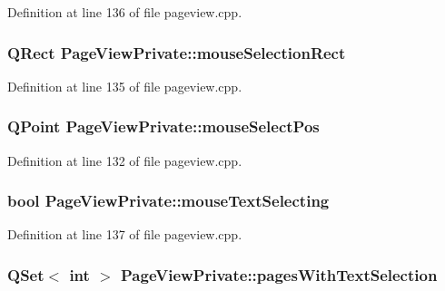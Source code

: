 Definition at line 136 of file pageview.\+cpp.

\hypertarget{classPageViewPrivate_a94473cb593838a977bea89214bd1ef66}{
\subsubsection[{mouse\+Selection\+Rect}]{\setlength{\rightskip}{0pt plus 5cm}Q\+Rect Page\+View\+Private\+::mouse\+Selection\+Rect}}\label{classPageViewPrivate_a94473cb593838a977bea89214bd1ef66}


Definition at line 135 of file pageview.\+cpp.

\hypertarget{classPageViewPrivate_aaf8d4b01e8bb0db7ff49544972422a63}{
\subsubsection[{mouse\+Select\+Pos}]{\setlength{\rightskip}{0pt plus 5cm}Q\+Point Page\+View\+Private\+::mouse\+Select\+Pos}}\label{classPageViewPrivate_aaf8d4b01e8bb0db7ff49544972422a63}


Definition at line 132 of file pageview.\+cpp.

\hypertarget{classPageViewPrivate_a64e9f3610cf2b731a3c0c4eae976e687}{
\subsubsection[{mouse\+Text\+Selecting}]{\setlength{\rightskip}{0pt plus 5cm}bool Page\+View\+Private\+::mouse\+Text\+Selecting}}\label{classPageViewPrivate_a64e9f3610cf2b731a3c0c4eae976e687}


Definition at line 137 of file pageview.\+cpp.

\hypertarget{classPageViewPrivate_ad82b596dc262e93c2268297b9eee8956}{
\subsubsection[{pages\+With\+Text\+Selection}]{\setlength{\rightskip}{0pt plus 5cm}Q\+Set$<$ int $>$ Page\+View\+Private\+::pages\+With\+Text\+Selection}}\label{classPageViewPrivate_ad82b596dc262e93c2268297b9eee8956}


